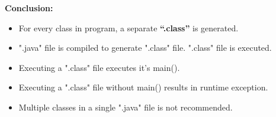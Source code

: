 \begin{flushleft}
\begin{itemize}
\begin{itemize}
			\bigskip
		\end{itemize}
	\end{itemize}

	\textbf{Conclusion:}
	\begin{itemize}
		\item For every class in program, a separate \textbf{“.class”} is generated.
		\item ".java" file is compiled to generate ".class" file. ".class" file is executed.
		\item Executing a ".class" file executes it's main().
		\item Executing a ".class" file without main() results in runtime exception.
		\item Multiple classes in a single ".java" file is not recommended. 
	\end{itemize}
	
\end{flushleft}
\newpage



